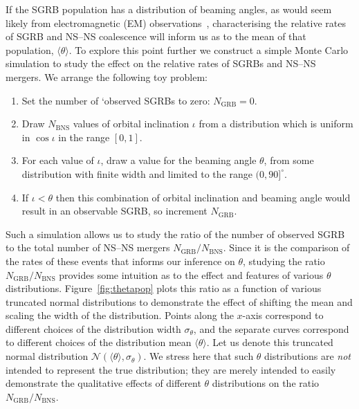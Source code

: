 \documentclass[twocolumn]{aastex61}
\newcommand{\BNS}{\ac{NS}--\ac{NS}\xspace}
\def\electro#1{electromagnetic#1 (EM#1)\gdef\electro{EM}}
\begin{document}
If the \ac{SGRB} population has a distribution of beaming angles, as would seem
likely from \electro{} observations~\cite{Fong:2015oha}, characterising the
relative rates of \ac{SGRB} and \BNS coalescence will inform us as to the mean
of that population, $\langle \theta \rangle$.  To explore this point further we
construct a simple Monte Carlo simulation to study the effect on the relative
rates of \acp{SGRB} and \BNS mergers. We arrange the following toy problem:
%
\begin{enumerate}
    \item Set the number of `observed \acp{SGRB} to zero: $N_{\mathrm{GRB}}=0$.
    \item Draw $N_{\mathrm{BNS}}$ values of orbital inclination $\iota$ from a distribution which is uniform in $\cos \iota$ in the range $[0,1]$.
    \item For each value of $\iota$, draw a value for the beaming angle $\theta$, from some distribution with finite width and limited to the range $(0,90]^{\circ}$.
    \item If $\iota<\theta$ then this combination of orbital inclination and beaming angle would result in an observable \ac{SGRB}, so increment $N_{\mathrm{GRB}}$.
\end{enumerate}
%
Such a simulation allows us to study the ratio of the number of
observed \ac{SGRB} to the total number of \BNS mergers
$N_{\mathrm{GRB}}/N_{\mathrm{BNS}}$.  Since it is the comparison of
the rates of these events that informs our inference on $\theta$,
studying the ratio $N_{\mathrm{GRB}}/N_{\mathrm{BNS}}$ provides some
intuition as to the effect and features of various $\theta$
distributions.  Figure~\ref{fig:thetapop} plots this ratio as a
function of various truncated normal distributions to demonstrate the
effect of shifting the mean and scaling the width of the distribution.
Points along the $x$-axis correspond to different choices of the
distribution width $\sigma_{\theta}$, and the separate curves
correspond to different choices of the distribution mean
$\langle \theta \rangle$.  Let us denote this truncated normal
distribution ${\mathcal N}(\langle \theta \rangle, \sigma_{\theta})$.
We stress here that such $\theta$ distributions are \emph{not}
intended to represent the true distribution; they are merely intended
to easily demonstrate the qualitative effects of different $\theta$
distributions on the ratio $N_{\mathrm{GRB}}/N_{\mathrm{BNS}}$.
\end{document}

